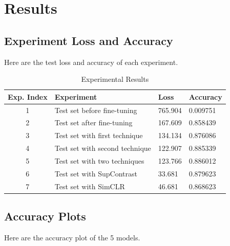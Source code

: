 \section*{Results}

\subsection*{Experiment Loss and Accuracy}

Here are the test loss and accuracy of each experiment.

\begin{table}[H]
    \centering
    \begin{tabular}{|c|l|l|l|}
        \hline
        Exp. Index & Experiment & Loss & Accuracy \\
        \hline
        1 & Test set before fine-tuning    & 765.904 & 0.009751 \\
        \hline
        2 & Test set after fine-tuning     & 167.609 & 0.858439 \\
        \hline
        3 & Test set with first technique  & 134.134 & 0.876086 \\
        \hline
        4 & Test set with second technique & 122.907 & 0.885339 \\
        \hline
        5 & Test set with two techniques   & 123.766 & 0.886012 \\
        \hline
        6 & Test set with SupContrast      & 33.681 & 0.879623 \\
        \hline
        7 & Test set with SimCLR           & 46.681 & 0.868623 \\
        \hline
    \end{tabular}
    \vspace{2mm}
    \caption{Experimental Results}
    \label{tab:exp}
\end{table}

\subsection*{Accuracy Plots}

Here are the accuracy plot of the 5 models.

